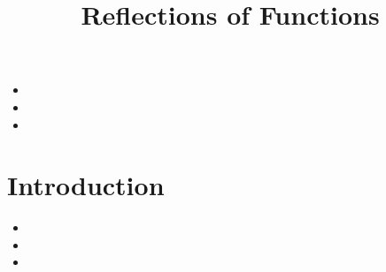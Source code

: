 \documentclass{ximera}
\author{}
\title{Reflections of Functions}
\begin{document}
\begin{abstract}
  
\end{abstract}
\maketitle



\begin{motivatingQuestions}\begin{itemize}
\item 
\item 
\item 
\end{itemize}\end{motivatingQuestions}



\section{Introduction}






\begin{summary}\begin{itemize}
\item 
\item 
\item
\end{itemize}\end{summary}
\end{document}
